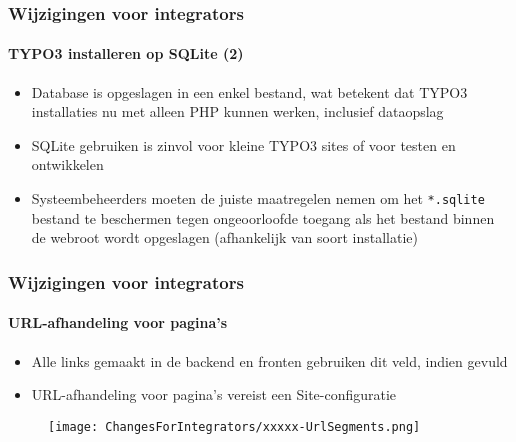 \begin{frame}[fragile]
	\frametitle{Wijzigingen voor integrators}
	\framesubtitle{TYPO3 installeren op SQLite (2)}

	\begin{itemize}
		\item Database is opgeslagen in een enkel bestand, wat betekent dat
			TYPO3 installaties nu met alleen PHP kunnen werken, inclusief dataopslag
		\item SQLite gebruiken is zinvol voor kleine TYPO3 sites of voor
			testen en ontwikkelen
		\item Systeembeheerders moeten de juiste maatregelen nemen om het
			\texttt{*.sqlite} bestand te beschermen tegen ongeoorloofde toegang als het bestand
			 binnen de webroot wordt opgeslagen (afhankelijk van soort installatie)
	\end{itemize}

\end{frame}


\begin{frame}[fragile]
	\frametitle{Wijzigingen voor integrators}
	\framesubtitle{URL-afhandeling voor pagina's}

	\begin{itemize}
		\item Alle links gemaakt in de backend en fronten gebruiken dit veld,
			indien gevuld
		\item URL-afhandeling voor pagina's vereist een Site-configuratie
	\end{itemize}

	\begin{figure}
		\texttt{[image: ChangesForIntegrators/xxxxx-UrlSegments.png]}
	\end{figure}

\end{frame}


